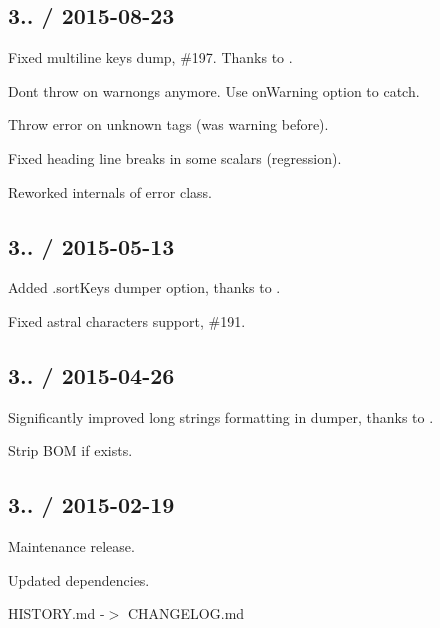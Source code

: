 \subsection*{3.. / 2015-\/08-\/23 }


\begin{DoxyItemize}
\item Fixed multiline keys dump, \#197. Thanks to .
\item Don\textquotesingle{}t throw on warnongs anymore. Use {\ttfamily on\+Warning} option to catch.
\item Throw error on unknown tags (was warning before).
\item Fixed heading line breaks in some scalars (regression).
\item Reworked internals of error class.
\end{DoxyItemize}

\subsection*{3.. / 2015-\/05-\/13 }


\begin{DoxyItemize}
\item Added {\ttfamily .sort\+Keys} dumper option, thanks to .
\item Fixed astral characters support, \#191.
\end{DoxyItemize}

\subsection*{3.. / 2015-\/04-\/26 }


\begin{DoxyItemize}
\item Significantly improved long strings formatting in dumper, thanks to .
\item Strip B\+OM if exists.
\end{DoxyItemize}

\subsection*{3.. / 2015-\/02-\/19 }


\begin{DoxyItemize}
\item Maintenance release.
\item Updated dependencies.
\item H\+I\+S\+T\+O\+R\+Y.\+md -\/$>$ C\+H\+A\+N\+G\+E\+L\+O\+G.\+md
\end{DoxyItemize}

